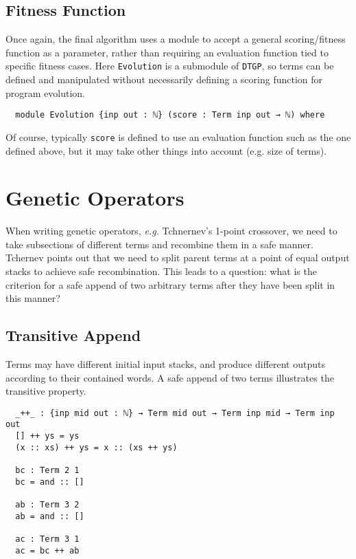\documentclass[runningheads,a4paper]{llncs}
\begin{document}
\subsection{Fitness Function}

Once again, the final algorithm uses a module to accept a general scoring/fitness
function as a parameter, rather than requiring an evaluation function
tied to specific fitness cases. Here \texttt{Evolution} is a submodule
of \texttt{DTGP}, so terms can be defined and manipulated without
necessarily defining a scoring function for program evolution.

\begin{verbatim}
  module Evolution {inp out : ℕ} (score : Term inp out → ℕ) where
\end{verbatim}

Of course, typically \texttt{score} is defined to use an evaluation
function such as the one defined above, but it may take other things
into account (e.g. size of terms).

\section{Genetic Operators}

When writing genetic operators, \textit{e.g.} Tchnernev's \cite{tchernev:forthcross}
1-point crossover, we need to take subsections of different terms and recombine
them in a safe manner. Tchernev points out that we need to split parent terms at a
point of equal output stacks to achieve safe recombination. This leads to a question:
what is the criterion for a safe append of two arbitrary terms after
they have been split in this manner?

\subsection{Transitive Append}

Terms may have different initial input stacks, and produce
different outputs according to their contained words. A safe append
of two terms illustrates the transitive property. 

\begin{verbatim}
  _++_ : {inp mid out : ℕ} → Term mid out → Term inp mid → Term inp out
  [] ++ ys = ys
  (x :: xs) ++ ys = x :: (xs ++ ys)

  bc : Term 2 1
  bc = and :: []

  ab : Term 3 2
  ab = and :: []

  ac : Term 3 1
  ac = bc ++ ab
\end{verbatim}
\end{document}
